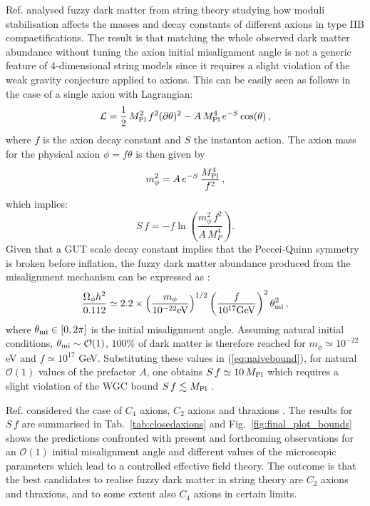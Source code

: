 Ref. \cite{Cicoli:2021gss} analysed fuzzy dark matter from string theory studying how moduli stabilisation affects the masses and decay constants of different axions in type IIB compactifications. The result is that matching the whole observed dark matter abundance without tuning the axion initial misalignment angle is not a generic feature of 4-dimensional string models since it requires a slight violation of the weak gravity conjecture applied to axions. This can be easily seen as follows in the case of a single axion with Lagrangian: 
\begin{equation}
{\cal L}=\frac{1}{2}\,M_{\rm Pl}^2\,f^2(\partial \theta)^2-A\,M_{\rm Pl}^4\,e^{-S}\cos(\theta)\,,
\label{eq:AxionLagr}
\end{equation}
where $f$ is the axion decay constant and $S$ the instanton action. The axion mass for the physical axion $\phi=f\theta$ is then given by
\begin{equation}
m_\phi^2=A \, e^{-S}\,\frac{M_{\rm Pl}^4}{f^2}\,,
\label{eq:axionmassgen} 
\end{equation} 
which implies:
\begin{equation}
S\,f=-f\ln\left(\frac{m_\phi^2\,f^2}{A\, M_P^4} \right).
\label{eq:naivebound}
\end{equation}
Given that a GUT scale decay constant implies that the Peccei-Quinn symmetry is broken before inflation, the fuzzy dark matter abundance produced from the misalignment mechanism can be expressed as \cite{Cicoli:2012sz}:
\begin{equation}
\frac{\Omega_{\phi}h^2}{0.112}\simeq 2.2 \times \left(\frac{m_\phi}{10^{-22} \mbox{eV}}\right)^{1/2}
\left(\frac{f}{10^{17}\mbox{GeV}}\right)^2 \theta_{\rm mi}^2\,,
\label{eq:DMabundance}
\end{equation}
where $\theta_{\rm mi}\in [0,2\pi]$ is the initial misalignment angle. Assuming natural initial conditions, $\theta_{\rm mi}\sim\mathcal{O}(1)$, $100\%$ of dark matter is therefore reached for $m_\phi \simeq 10^{-22}$ eV and $f\simeq 10^{17}$ GeV. Substituting these values in (\ref{eq:naivebound}), for natural $\mathcal{O}(1)$ values of the prefactor $A$, one obtains $S\,f\simeq 10\,M_{\rm Pl}$ which requires a slight violation of the WGC bound $S\,f\lesssim M_{\rm Pl}$ \cite{Arkani-Hamed:2006emk, Alonso:2017avz,Hebecker:2018ofv}. 

Ref. \cite{Cicoli:2021gss} considered the case of $C_4$ axions, $C_2$ axions and thraxions \cite{Hebecker:2018yxs}. The results for $S\,f$ are summarised in Tab.~\ref{tab:closedaxions} and Fig.~\ref{fig:final_plot_bounds} shows the predictions confronted with present and forthcoming observations for an $\mathcal{O}(1)$ initial misalignment angle and different values of the microscopic parameters which lead to a controlled effective field theory. The outcome is that the best candidates to realise fuzzy dark matter in string theory are $C_2$ axions and thraxions, and to some extent also $C_4$ axions in certain limits.

